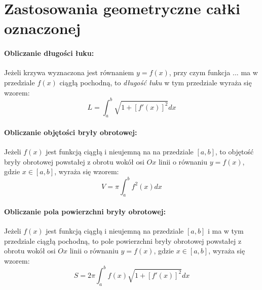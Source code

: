 \documentclass[a4paper,12pt]{book}
\begin{document}
     

\section*{Zastosowania geometryczne całki oznaczonej} 


\paragraph{Obliczanie długości łuku:}
Jeżeli krzywa wyznaczona jest równaniem $y = f(x)$, przy czym \mbox{funkcja}
$...$ ma w przedziale $f(x)$ ciągłą pochodną, to {\em długość łuku} w tym
przedziale wyraża się wzorem: $$L = \int_{a}^{b} \sqrt{1+{[f'(x)]}^2} dx$$

\paragraph{Obliczanie objętości bryły obrotowej:}
Jeżeli $f(x)$ jest funkcją ciągłą i nieujemną na na przedziale $[a,b]$, to
objętość bryły obrotowej powstałej z obrotu wokół osi $Ox$ linii o równaniu
$y=f(x)$, gdzie $x \in [a,b]$, wyraża się wzorem:
$$V = \pi \int_{a}^{b} f^{2}(x) dx$$

\paragraph{Obliczanie pola powierzchni bryły obrotowej:}
Jeżeli $f(x)$ jest funkcją ciągłą i nieujemną na przedziale $[a,b]$ i ma w
tym przedziale ciągłą pochodną, to pole powierzchni bryły obrotowej powstałej z
obrotu wokół osi $Ox$ linii o równaniu  $y=f(x)$, gdzie $x\in[a,b]$, wyraża się
wzorem:
$$S = 2\pi \int_{a}^{b}f(x) \sqrt{1+{[f'(x)]}^2} dx $$
\end{document}
